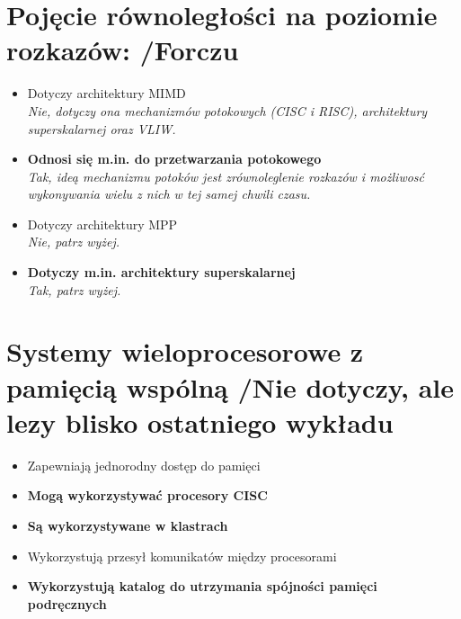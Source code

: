 \documentclass[a4paper,twoside]{article}
\begin{document}
\section{Pojęcie równoległości na poziomie rozkazów: {\small /Forczu}}
	\begin{itemize}
    \item Dotyczy architektury MIMD\\
    {\small \emph{Nie, dotyczy ona mechanizmów potokowych (CISC i RISC), architektury superskalarnej oraz VLIW.}}
    \item \textbf{Odnosi się m.in. do przetwarzania potokowego}\\
    {\small \emph{Tak, ideą mechanizmu potoków jest zrównoleglenie rozkazów i możliwosć wykonywania wielu z nich w tej samej chwili czasu.}}
    \item Dotyczy architektury MPP\\
    {\small \emph{Nie, patrz wyżej.}}
    \item \textbf{Dotyczy m.in. architektury superskalarnej}\\
    {\small \emph{Tak, patrz wyżej.}}
    \end{itemize}

\section{Systemy wieloprocesorowe z pamięcią wspólną {\small /Nie dotyczy, ale lezy blisko ostatniego wykładu}}
	\begin{itemize}
    \item Zapewniają jednorodny dostęp do pamięci
    \item \textbf{Mogą wykorzystywać procesory CISC}
    \item \textbf{Są wykorzystywane w klastrach}
    \item Wykorzystują przesył komunikatów między procesorami
    \item \textbf{Wykorzystują katalog do utrzymania spójności pamięci podręcznych}
    \end{itemize}

\end{document}
